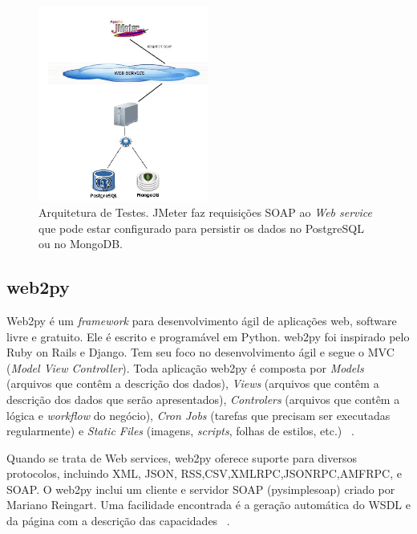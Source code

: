 	\begin{figure}[!htbp]
		\begin{center}
			\includegraphics[width=0.5\textwidth]{arquitetura}
		\end{center}
		\caption{Arquitetura de Testes. JMeter faz requisições SOAP ao \textit{Web service} que pode estar configurado para persistir os dados no PostgreSQL ou no MongoDB.}
		\label{fig:arquitetura}
	\end{figure}

\subsection{web2py}

Web2py é um \textit{framework} para desenvolvimento ágil de aplicações web, software livre e gratuito. Ele é escrito e programável em Python. web2py foi inspirado pelo Ruby on Rails e Django. Tem seu foco no desenvolvimento ágil e segue o MVC (\textit{Model View Controller}). Toda aplicação web2py é composta por \textit{Models} (arquivos que contêm a descrição dos dados), \textit{Views} (arquivos que contêm a descrição dos dados que serão apresentados), \textit{Controlers} (arquivos que contêm a lógica e \textit{workflow} do negócio), \textit{Cron Jobs} (tarefas que precisam ser executadas regularmente) e \textit{Static Files} (imagens, \textit{scripts}, folhas de estilos, etc.) ~\cite{siteweb2py}.

Quando se trata de Web services, web2py oferece suporte para diversos protocolos, incluindo XML, JSON, RSS,CSV,XMLRPC,JSONRPC,AMFRPC, e SOAP.  O web2py inclui um cliente e servidor SOAP (pysimplesoap) criado por Mariano Reingart. Uma facilidade encontrada é a geração automática do WSDL e da página com a descrição das capacidades ~\cite{siteweb2py}.

